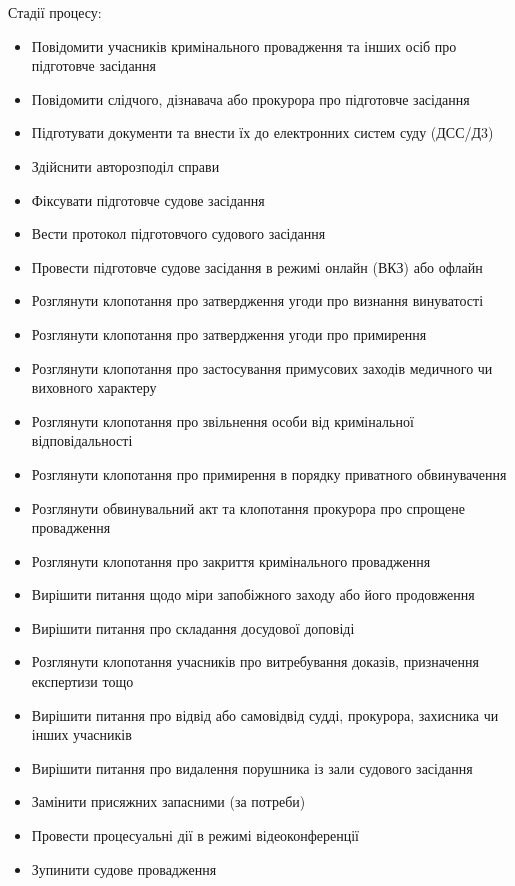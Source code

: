 \documentclass{article}
\begin{document}
Стадії процесу:

\begin{itemize}
    \item Повідомити учасників кримінального провадження та інших осіб про підготовче засідання
    \item Повідомити слідчого, дізнавача або прокурора про підготовче засідання
    \item Підготувати документи та внести їх до електронних систем суду (ДСС/Д3)
    \item Здійснити авторозподіл справи
    \item Фіксувати підготовче судове засідання
    \item Вести протокол підготовчого судового засідання
    \item Провести підготовче судове засідання в режимі онлайн (ВКЗ) або офлайн
    \item Розглянути клопотання про затвердження угоди про визнання винуватості
    \item Розглянути клопотання про затвердження угоди про примирення
    \item Розглянути клопотання про застосування примусових заходів медичного чи виховного характеру
    \item Розглянути клопотання про звільнення особи від кримінальної відповідальності
    \item Розглянути клопотання про примирення в порядку приватного обвинувачення
    \item Розглянути обвинувальний акт та клопотання прокурора про спрощене провадження
    \item Розглянути клопотання про закриття кримінального провадження
    \item Вирішити питання щодо міри запобіжного заходу або його продовження
    \item Вирішити питання про складання досудової доповіді
    \item Розглянути клопотання учасників про витребування доказів, призначення експертизи тощо
    \item Вирішити питання про відвід або самовідвід судді, прокурора, захисника чи інших учасників
    \item Вирішити питання про видалення порушника із зали судового засідання
    \item Замінити присяжних запасними (за потреби)
    \item Провести процесуальні дії в режимі відеоконференції
    \item Зупинити судове провадження

\end{itemize}
\end{document}
